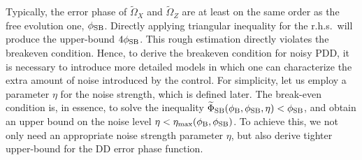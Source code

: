 \documentclass[b5paper,11pt]{article}
\newcommand{\wt}[1]{\widetilde{#1}}
\newcommand{\rmax}{\mathrm{max}}
\begin{document}
Typically, the error phase of $\wt\Omega_X$ and $\wt\Omega_Z$ are at least on the same order as the free evolution one, $\phi_{\mathrm{SB}}$.
Directly applying triangular inequality for the r.h.s.\ will produce the  upper-bound $4\phi_{\mathrm{SB}}$. This rough estimation directly violates the breakeven condition. Hence, to derive the breakeven condition for noisy PDD, it is necessary to introduce more detailed models in which one can characterize the extra amount of noise introduced by the control. 
 For simplicity, let us employ a parameter $\eta$ for the noise strength, which is defined later.  The break-even condition is, in essence, to solve the inequality
$\wt\Phi_\rSB(\phi_\rB,\phi_\rSB,\eta) < \phi_\rSB$,
and obtain an upper bound on the noise level $\eta<\eta_{\rmax}(\phi_\rB, \phi_\rSB)$.
To achieve this, we not only need an appropriate noise strength parameter $\eta$, but also derive tighter upper-bound for the DD error phase function.
\end{document}
